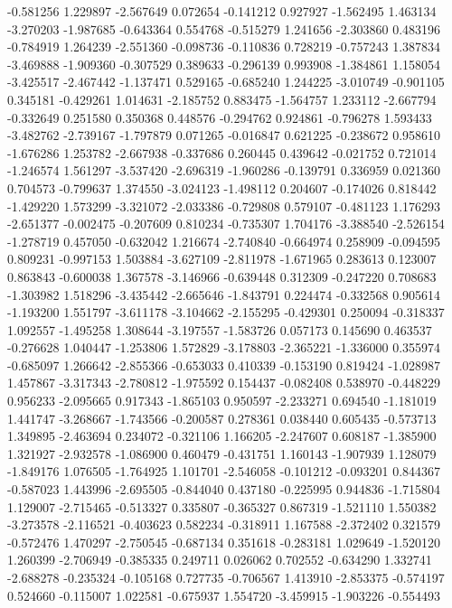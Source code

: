 -0.581256
1.229897
-2.567649
0.072654
-0.141212
0.927927
-1.562495
1.463134
-3.270203
-1.987685
-0.643364
0.554768
-0.515279
1.241656
-2.303860
0.483196
-0.784919
1.264239
-2.551360
-0.098736
-0.110836
0.728219
-0.757243
1.387834
-3.469888
-1.909360
-0.307529
0.389633
-0.296139
0.993908
-1.384861
1.158054
-3.425517
-2.467442
-1.137471
0.529165
-0.685240
1.244225
-3.010749
-0.901105
0.345181
-0.429261
1.014631
-2.185752
0.883475
-1.564757
1.233112
-2.667794
-0.332649
0.251580
0.350368
0.448576
-0.294762
0.924861
-0.796278
1.593433
-3.482762
-2.739167
-1.797879
0.071265
-0.016847
0.621225
-0.238672
0.958610
-1.676286
1.253782
-2.667938
-0.337686
0.260445
0.439642
-0.021752
0.721014
-1.246574
1.561297
-3.537420
-2.696319
-1.960286
-0.139791
0.336959
0.021360
0.704573
-0.799637
1.374550
-3.024123
-1.498112
0.204607
-0.174026
0.818442
-1.429220
1.573299
-3.321072
-2.033386
-0.729808
0.579107
-0.481123
1.176293
-2.651377
-0.002475
-0.207609
0.810234
-0.735307
1.704176
-3.388540
-2.526154
-1.278719
0.457050
-0.632042
1.216674
-2.740840
-0.664974
0.258909
-0.094595
0.809231
-0.997153
1.503884
-3.627109
-2.811978
-1.671965
0.283613
0.123007
0.863843
-0.600038
1.367578
-3.146966
-0.639448
0.312309
-0.247220
0.708683
-1.303982
1.518296
-3.435442
-2.665646
-1.843791
0.224474
-0.332568
0.905614
-1.193200
1.551797
-3.611178
-3.104662
-2.155295
-0.429301
0.250094
-0.318337
1.092557
-1.495258
1.308644
-3.197557
-1.583726
0.057173
0.145690
0.463537
-0.276628
1.040447
-1.253806
1.572829
-3.178803
-2.365221
-1.336000
0.355974
-0.685097
1.266642
-2.855366
-0.653033
0.410339
-0.153190
0.819424
-1.028987
1.457867
-3.317343
-2.780812
-1.975592
0.154437
-0.082408
0.538970
-0.448229
0.956233
-2.095665
0.917343
-1.865103
0.950597
-2.233271
0.694540
-1.181019
1.441747
-3.268667
-1.743566
-0.200587
0.278361
0.038440
0.605435
-0.573713
1.349895
-2.463694
0.234072
-0.321106
1.166205
-2.247607
0.608187
-1.385900
1.321927
-2.932578
-1.086900
0.460479
-0.431751
1.160143
-1.907939
1.128079
-1.849176
1.076505
-1.764925
1.101701
-2.546058
-0.101212
-0.093201
0.844367
-0.587023
1.443996
-2.695505
-0.844040
0.437180
-0.225995
0.944836
-1.715804
1.129007
-2.715465
-0.513327
0.335807
-0.365327
0.867319
-1.521110
1.550382
-3.273578
-2.116521
-0.403623
0.582234
-0.318911
1.167588
-2.372402
0.321579
-0.572476
1.470297
-2.750545
-0.687134
0.351618
-0.283181
1.029649
-1.520120
1.260399
-2.706949
-0.385335
0.249711
0.026062
0.702552
-0.634290
1.332741
-2.688278
-0.235324
-0.105168
0.727735
-0.706567
1.413910
-2.853375
-0.574197
0.524660
-0.115007
1.022581
-0.675937
1.554720
-3.459915
-1.903226
-0.554493
